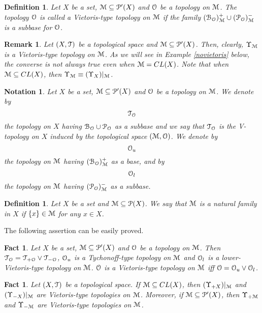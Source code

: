 \documentclass[12pt,draft,leqno]{article}
\newtheorem{defi}[theorem]{Definition}
\newtheorem{nota}[theorem]{Notation}
\newtheorem{rem}[theorem]{Remark}
\newtheorem{fact}[theorem]{Fact}
\def\UP{\Upsilon}
\def\ap{^\prime}
\def\BB{{\cal B}}
\def\MM{{\cal M}}
\def\OO{{\cal O}}
\def\PP{{\cal P}}
\def\TT{{\cal T}}
\begin{document}
\begin{defi}\label{vietoris-type}
\rm
Let $X$ be a set, $\MM\subseteq\PP\ap(X)$ and $\OO$ be a topology on $\MM$. The topology $\OO$ is called a {\em Vietoris-type topology on} $\MM$ if the family $(\BB_{\OO})_{\MM}^+\cup(\PP_{\OO})_{\MM}^-$ is a subbase for $\OO$.
\end{defi}

\begin{rem}\label{2.1'}
\rm
Let $(X,\TT)$ be a topological space and $\MM\subseteq\PP\ap(X)$. Then, clearly, $\UP_{\MM}$ is a Vietoris-type topology on $\MM$. As we will see in Example \ref{novietoris} below, the converse is not always true even when $\MM=CL(X)$. Note that when $\MM\subseteq CL(X)$, then $\UP_{\MM}\equiv(\UP_X)|_{\MM}$.
\end{rem}

\begin{nota}\label{V-top}
\rm
Let $X$ be a set, $\MM\subseteq\PP\ap(X)$ and $\OO$ be a topology on $\MM$. We denote by $$\TT_{\OO}$$ the topology on $X$ having $\BB_{\OO}\cup\PP_{\OO}$ as a subbase and we say that $\TT_{\OO}$ is the {\em V-topology on} $X$ {\em induced by the topological space} $(\MM,\OO)$. We denote by $$\OO_u$$ the topology on $\MM$ having $(\BB_{\OO})_{\MM}^+$ as a base, and by $$\OO_l$$ the topology on $\MM$ having $(\PP_{\OO})_{\MM}^-$ as a subbase.
\end{nota}

\begin{defi}\label{natural}
\rm
Let $X$ be a set and $\MM\subseteq\PP(X)$. We say that $\MM$ is a {\em natural family in} $X$ if $\{x\}\in\MM$ for any $x\in X$.
\end{defi}

The following assertion can be easily proved.

\begin{fact}\label{supremum}
Let $X$ be a set, $\MM\subseteq\PP\ap(X)$ and $\OO$ be a topology on $\MM$. Then $\TT_{\OO}=\TT_{+\OO}\vee\TT_{-\OO}$, $\OO_u$ is a Tychonoff-type topology on $\MM$ and $\OO_l$ is a lower-Vietoris-type topology on $\MM$. $\OO$ is a Vietoris-type topology on $\MM$ iff $\OO=\OO_u\vee\OO_l$.
\end{fact}

\begin{fact}\label{fv3}
Let $(X,\TT)$ be a topological space. If $\MM\subseteq CL(X)$, then $(\UP_{+X})|_{\MM}$ and $(\UP_{-X})|_{\MM}$ are Vietoris-type topologies on $\MM$. Moreover, if $\MM\subseteq\PP\ap(X)$, then $\UP_{+\MM}$ and $\UP_{-\MM}$ are Vietoris-type topologies on $\MM$.
\end{fact}
\end{document}
